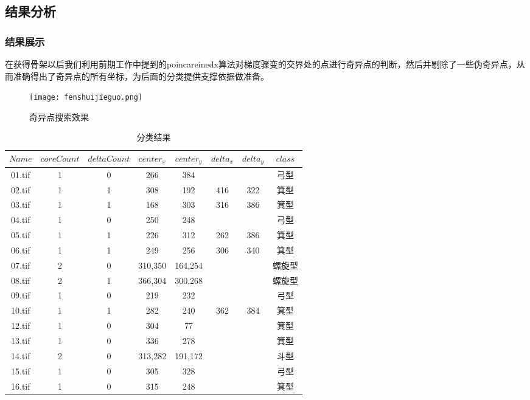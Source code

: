 \documentclass[withoutpreface,bwprint]{cumcmthesis} %
\begin{document}
\subsection{结果分析}
\subsubsection{结果展示}
在获得骨架以后我们利用前期工作中提到的poincareinedx算法对梯度骤变的交界处的点进行奇异点的判断，然后并剔除了一些伪奇异点，从而准确得出了奇异点的所有坐标，为后面的分类提供支撑依据做准备。
\begin{figure}[!h]
	\centering
	\texttt{[image: fenshuijieguo.png]}
	\caption{奇异点搜索效果}
\end{figure}
\begin{table}[!htbp]
	\caption{分类结果} \centering
	\begin{tabular}{cccccccc}
		\toprule[1.5pt]
$Name$ & $coreCount$ & $deltaCount$ & $center_x$ & $center_y$ & $delta_x$ & $delta_y$ &  $class$\\
		\midrule[1pt]

01.tif&	1&	0&	    266&	    384&	  &   	&	弓型\\
02.tif&	1&	1&	    308&	    192&   416&	 322&	箕型\\
03.tif&	1&	1&	    168&	    303&   316&	 386&	箕型\\
04.tif&	1&	0&	    250&	    248&	  &		&   弓型\\
05.tif&	1&	1&	    226&	    312&   262&  386&	箕型\\
06.tif&	1&	1&	    249&	    256&   306&	 340&	箕型\\
07.tif&	2&	0&	310,350&	164,254&	  &	    &	螺旋型\\
08.tif&	2&	1&	366,304&	300,268&	  &	    &	螺旋型\\
09.tif&	1&	0&	    219&	    232&	  &	    &   弓型\\
10.tif&	1&	1&	    282&        240&   362&	 384&	箕型\\
12.tif&	1&	0&	    304&	     77&	  &     &   箕型\\
13.tif&	1&	0&	    336& 	    278&	  &		&   箕型\\
14.tif&	2&	0&	    313,282&	    191,172&	  &		&   斗型\\
15.tif&	1&	0&  	305&	    328&	  &		&   弓型\\
16.tif&	1&	0&	    315&	    248&	  &	    &   箕型\\
		\bottomrule[1.5pt]
	\end{tabular}
\end{table}
\end{document}
